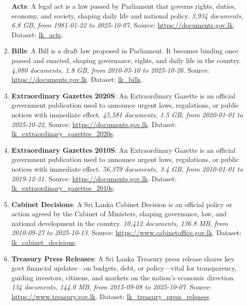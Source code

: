 \documentclass[10pt,a4paper]{article}%
\begin{document}
\begin{enumerate}
\textbf{Acts}: A legal act is a law passed by Parliament that governs rights, duties, economy, and society, shaping daily life and national policy.\textit{ 3,934 documents, 6.8 GB, from 1981{-}01{-}22 to 2025{-}10{-}07.} Source: \href{https://documents.gov.lk}{https://documents.gov.lk}. Dataset: \href{https://github.com/nuuuwan/lk\_legal\_docs/tree/data\_lk\_acts/data/lk\_acts}{lk\_acts}.%
\item%
\textbf{Bills}: A Bill is a draft law proposed in Parliament. It becomes binding once passed and enacted, shaping governance, rights, and daily life in the country.\textit{ 4,080 documents, 1.8 GB, from 2010{-}05{-}10 to 2025{-}10{-}26.} Source: \href{https://documents.gov.lk}{https://documents.gov.lk}. Dataset: \href{https://github.com/nuuuwan/lk\_legal\_docs/tree/data\_lk\_bills/data/lk\_bills}{lk\_bills}.%
\item%
\textbf{Extraordinary Gazettes 2020S}: An Extraordinary Gazette is an official government publication used to announce urgent laws, regulations, or public notices with immediate effect.\textit{ 45,581 documents, 1.5 GB, from 2020{-}01{-}01 to 2025{-}10{-}22.} Source: \href{https://documents.gov.lk}{https://documents.gov.lk}. Dataset: \href{https://github.com/nuuuwan/lk\_legal\_docs/tree/data\_lk\_extraordinary\_gazettes\_2020s/data/lk\_extraordinary\_gazettes\_2020s}{lk\_extraordinary\_gazettes\_2020s}.%
\item%
\textbf{Extraordinary Gazettes 2010S}: An Extraordinary Gazette is an official government publication used to announce urgent laws, regulations, or public notices with immediate effect.\textit{ 56,379 documents, 3.4 GB, from 2010{-}01{-}01 to 2019{-}12{-}31.} Source: \href{https://documents.gov.lk}{https://documents.gov.lk}. Dataset: \href{https://github.com/nuuuwan/lk\_legal\_docs/tree/data\_lk\_extraordinary\_gazettes\_2010s/data/lk\_extraordinary\_gazettes\_2010s}{lk\_extraordinary\_gazettes\_2010s}.%
\item%
\textbf{Cabinet Decisions}: A Sri Lanka Cabinet Decision is an official policy or action agreed by the Cabinet of Ministers, shaping governance, law, and national development in the country.\textit{ 10,412 documents, 136.8 MB, from 2010{-}09{-}27 to 2025{-}10{-}13.} Source: \href{https://www.cabinetoffice.gov.lk}{https://www.cabinetoffice.gov.lk}. Dataset: \href{https://github.com/nuuuwan/lk\_cabinet\_decisions/tree/data/data/lk\_cabinet\_decisions}{lk\_cabinet\_decisions}.%
\item%
\textbf{Treasury Press Releases}: A Sri Lanka Treasury press release shares key govt financial updates—on budgets, debt, or policy—vital for transparency, guiding investors, citizens, and markets on the nation’s economic direction.\textit{ 134 documents, 144.0 MB, from 2015{-}09{-}08 to 2025{-}10{-}07.} Source: \href{https://www.treasury.gov.lk}{https://www.treasury.gov.lk}. Dataset: \href{https://github.com/nuuuwan/lk\_treasury/tree/data\_lk\_treasury\_press\_releases/data/lk\_treasury\_press\_releases}{lk\_treasury\_press\_releases}.%

\end{enumerate}
\end{document}

